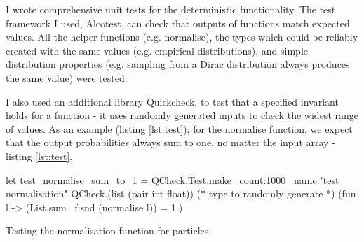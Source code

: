 I wrote comprehensive unit tests for the deterministic functionality. The test framework I used, Alcotest, can check that outputs of functions match expected values. All the helper functions (e.g. normalise), the types which could be reliably created with the same values (e.g. empirical distributions), and simple distribution properties (e.g. sampling from a Dirac distribution always produces the same value) were tested.

I also used an additional library Quickcheck, to test that a specified invariant holds for a function - it uses randomly generated inputs to check the widest range of values. As an example (listing \ref{lst:test}), for the normalise function, we expect that the output probabilities always sum to one, no matter the input array - listing \ref{lst:test}.
	
\begin{listing}[!htb]
	\centering
	\begin{ocamlcode-in} 
let test_normalise_sum_to_1 =
QCheck.Test.make ~count:1000 ~name:"test normalisation"
QCheck.(list (pair int float)) (* type to randomly generate *)
(fun l -> (List.sum ~f:snd (normalise l)) = 1.)
	\end{ocamlcode-in}
	\caption{Testing the normalisation function for particles}
	\label{lst:test}
\end{listing}
	
